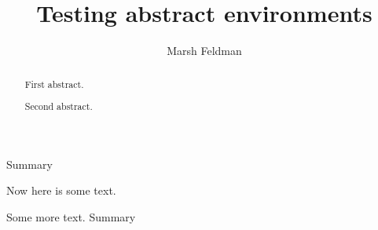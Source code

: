 \documentclass[]{memoir}
\title{Testing abstract environments}
\author{Marsh Feldman}
\begin{document}
\mainmatter
\abstractname{Summary}

\maketitle

Now here is some text. 
\begin{abstract}
First abstract.

\end{abstract}

Some more text.
\abstractname{Summary}

\renewcommand{\abstractname}{Summary}
\begin{abstract}
Second abstract.

\end{abstract}
\end{document}
